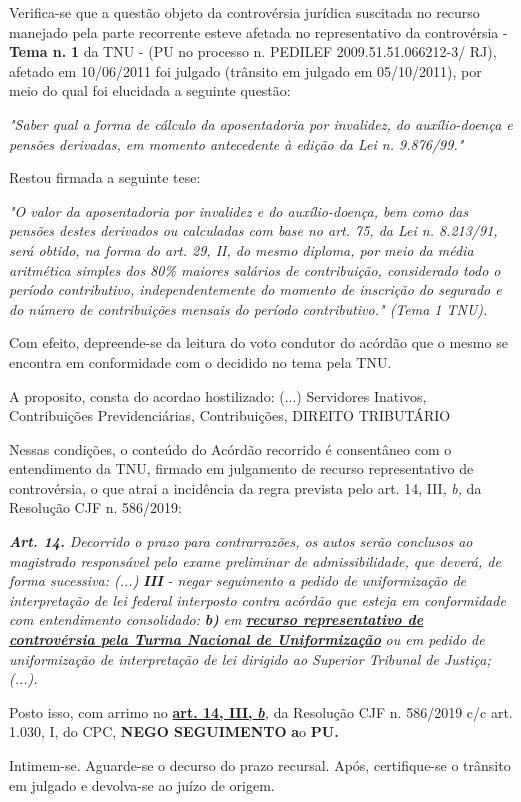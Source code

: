\documentclass[12pt]{article}
\begin{document}
\justifying
\noindent Verifica-se que a questão objeto da controvérsia jurídica suscitada no recurso manejado pela parte recorrente esteve afetada no representativo da controvérsia - \textbf{Tema n. }\textbf{1} da TNU - (PU no processo n. PEDILEF 2009.51.51.066212-3/ RJ),  afetado em 10/06/2011 foi julgado (trânsito em julgado em 05/10/2011), por meio do qual foi elucidada a seguinte questão:

\noindent \textit{"Saber qual a forma de cálculo da aposentadoria por invalidez, do auxílio-doença e pensões derivadas, em momento antecedente à edição da Lei n. 9.876/99."}

\noindent Restou firmada a seguinte tese:

\noindent \textit{"O valor da aposentadoria por invalidez e do auxílio-doença, bem como das pensões destes derivados ou calculadas com base no art. 75, da Lei n. 8.213/91, será obtido, na forma do art. 29, II, do mesmo diploma, por meio da média aritmética simples dos 80\% maiores salários de contribuição, considerado todo o período contributivo, independentemente do momento de inscrição do segurado e do número de contribuições mensais do período contributivo." (Tema 1 TNU).}

\noindent Com efeito, depreende-se da leitura do voto condutor do acórdão que o mesmo se encontra em conformidade com o decidido no  tema pela TNU.

\noindent A proposito, consta do acordao hostilizado: (...) Servidores Inativos, Contribuições Previdenciárias, Contribuições, DIREITO TRIBUTÁRIO

\noindent Nessas condições, o conteúdo do Acórdão recorrido é consentâneo com o entendimento da TNU, firmado em julgamento de recurso representativo de controvérsia, o que atrai a incidência da regra prevista pelo art. 14, III, \textit{b,} da Resolução CJF n. 586/2019:

\noindent \textit{\textbf{Art. 14.}}\textit{ Decorrido o prazo para contrarrazões, os autos serão conclusos ao magistrado responsável pelo exame preliminar de admissibilidade, que deverá, de forma sucessiva: (...) }\textit{\textbf{III }}\textit{- negar seguimento a pedido de uniformização de interpretação de lei federal interposto contra acórdão que esteja em conformidade com entendimento consolidado: }\textit{\textbf{b)}}\textit{ em }\uline{\textit{\textbf{recurso representativo de controvérsia pela Turma Nacional de Uniformização}}}\textit{ ou em pedido de uniformização de interpretação de lei dirigido ao Superior Tribunal de Justiça;(...).}

\noindent Posto isso, com arrimo no \uline{\textbf{art. 14, III, }}\uline{\textit{\textbf{b}}}\textit{,} da Resolução CJF n. 586/2019 c/c art. 1.030, I, do CPC, \textbf{NEGO SEGUIMENTO }\textbf{a}o\textbf{ PU}\textbf{.}

\noindent Intimem-se. Aguarde-se o decurso do prazo recursal. Após, certifique-se o trânsito em julgado e devolva-se ao juízo de origem.
\end{document}
